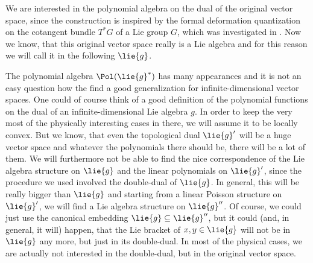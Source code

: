 We are interested in the polynomial algebra on the dual of the original vector 
space, since the construction is inspired by the formal deformation 
quantization on the cotangent bundle $T^*G$ of a Lie group $G$, which was 
investigated in \cite{BNW:1998:TStarQ1}. Now we know, that this original 
vector space really is a Lie algebra and for this reason we will call it in 
the following $\lie{g}$. 


The polynomial algebra $\Pol(\lie{g}^*)$ has many appearances and it is not an 
easy question how the find a good generalization for infinite-dimensional 
vector spaces. One could of course think of a good definition of the 
polynomial functions on the dual of an infinite-dimensional Lie algebra $g$. 
In order to keep the very most of the physically interesting cases in there, 
we will assume it to be locally convex. But we know, that even the topological 
dual $\lie{g}'$ will be a huge vector space and whatever the polynomials there 
should be, there will be a lot of them. We will furthermore not be able to 
find the nice correspondence of the Lie algebra structure on $\lie{g}$ and the 
linear polynomials on $\lie{g}'$, since the procedure we used involved the 
double-dual of $\lie{g}$. In general, this will be really bigger than 
$\lie{g}$ and starting from a linear Poisson structure on $\lie{g}'$, we will 
find a Lie algebra structure on $\lie{g}''$. Of course, we could just use the 
canonical embedding $\lie{g} \subseteq \lie{g}''$, but it could (and, in 
general, it will) happen, that the Lie bracket of $x,y \in \lie{g}$ will not 
be in $\lie{g}$ any more, but just in its double-dual. In most of the physical 
cases, we are actually not interested in the double-dual, but in the original 
vector space.


